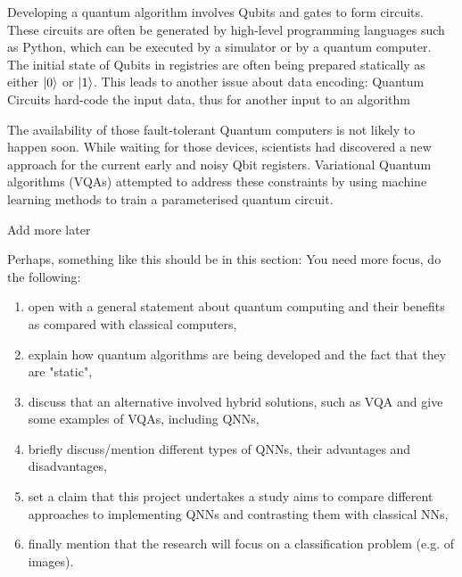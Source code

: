 Developing a quantum algorithm involves Qubits and gates to form circuits. 
These circuits are often be generated by high-level programming languages such as Python, which can be executed by a simulator or by a quantum computer. 
The initial state of Qubits in registries are often being prepared statically as either  $\ket{0}$ or $\ket{1}$. 
This leads to another issue about data encoding: Quantum Circuits hard-code the input data, thus for another input to an algorithm 

The availability of those fault-tolerant Quantum computers is not likely to happen soon. 
While waiting for those devices, scientists had discovered a new approach for the current early and noisy Qbit registers.
Variational Quantum algorithms (VQAs) \cite{cerezo2021variational} attempted to address these constraints by using machine learning methods to train a parameterised quantum circuit.
\begin{center}
    \vspace{10pt}
    Add more later
    \vspace{10pt} 
\end{center}
Perhaps, something like this should be in this section: You need more focus, do the following:
\begin{enumerate}
    \item open with a general statement about quantum computing and their benefits as compared with classical computers, 
    \item explain how quantum algorithms are being developed and the fact that they are "static",
    \item discuss that an alternative involved hybrid solutions, such as VQA and give some examples of VQAs, including QNNs, 
    \item briefly discuss/mention different types of QNNs, their advantages and disadvantages, 
    \item set a claim that this project undertakes a study aims to compare different approaches to implementing QNNs and contrasting them with classical NNs, 
    \item finally mention that the research will focus on a classification problem (e.g. of images).
\end{enumerate}
 